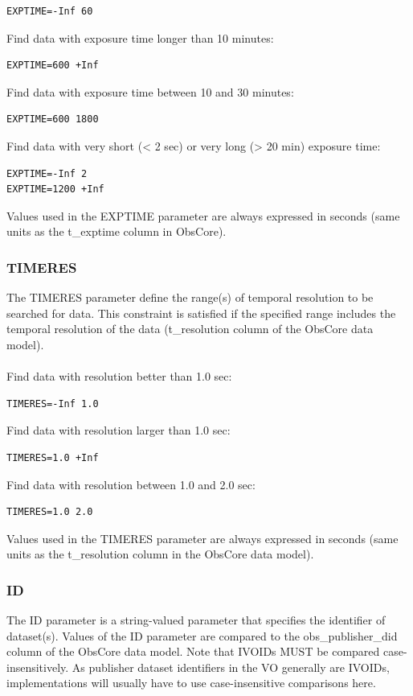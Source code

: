 \documentclass[11pt,a4paper]{ivoa}
\begin{document}
\begin{lstlisting}
EXPTIME=-Inf 60
\end{lstlisting}
Find data with exposure time longer than 10 minutes:

\begin{lstlisting}
EXPTIME=600 +Inf
\end{lstlisting}
Find data with exposure time between 10 and 30 minutes:

\begin{lstlisting}
EXPTIME=600 1800
\end{lstlisting}
Find data with very short (< 2 sec) or very long (> 20 min) exposure time:

\begin{lstlisting}
EXPTIME=-Inf 2
EXPTIME=1200 +Inf
\end{lstlisting}


Values used in the EXPTIME parameter are always expressed in seconds (same units as the t\_exptime column in ObsCore).

\subsubsection{TIMERES}
The TIMERES parameter define the range(s) of temporal resolution to be searched for data. This constraint is satisfied if the specified range includes the temporal resolution of the data (t\_resolution column of the ObsCore data model). \\ \\
Find data with resolution better than 1.0 sec:

\begin{lstlisting}
TIMERES=-Inf 1.0
\end{lstlisting}
Find data with resolution larger than 1.0 sec:

\begin{lstlisting}
TIMERES=1.0 +Inf
\end{lstlisting}
Find data with resolution between 1.0 and 2.0 sec:

\begin{lstlisting}
TIMERES=1.0 2.0
\end{lstlisting}

Values used in the TIMERES parameter are always expressed in seconds (same units as the t\_resolution column in the ObsCore  data model).

\subsubsection{ID}
\label{sec:ID}
The ID parameter is a string-valued parameter that specifies the identifier of dataset(s). Values of the ID parameter are compared to the obs\_publisher\_did column of the ObsCore data model. Note that IVOIDs MUST be compared case-insensitively. As publisher dataset identifiers in the VO generally are IVOIDs, implementations will usually have to use case-insensitive comparisons here.
\end{document}
